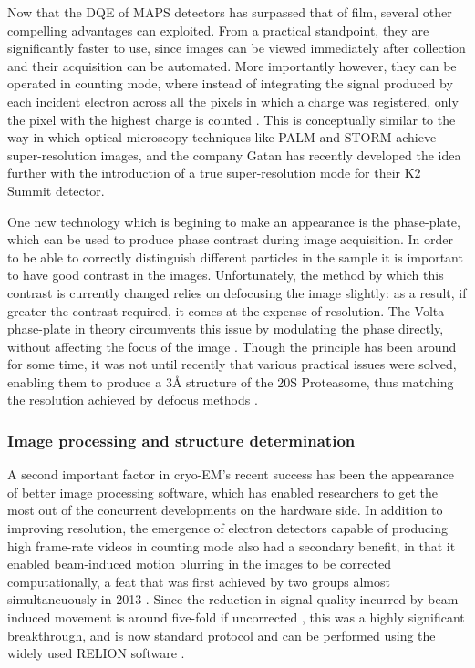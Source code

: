 \documentclass[a4paper,11pt,twoside,openright]{scrbook}
\begin{document}
Now that the DQE of MAPS detectors has surpassed that of film, several other compelling advantages can exploited. From a practical standpoint, they are significantly faster to use, since images can be viewed immediately after collection and their acquisition can be automated. More importantly however, they can be operated in counting mode, where instead of integrating the signal produced by each incident electron across all the pixels in which a charge was registered, only the pixel with the highest charge is counted \cite{McMullan2009a}. This is conceptually similar to the way in which optical microscopy techniques like PALM \cite{Betzig2006} and STORM \cite{Rust2006} achieve super-resolution images, and the company Gatan has recently developed the idea further with the introduction of a true super-resolution mode for their K2 Summit detector.

One new technology which is begining to make an appearance is the phase-plate, which can be used to produce phase contrast during image acquisition. In order to be able to correctly distinguish different particles in the sample it is important to have good contrast in the images. Unfortunately, the method by which this contrast is currently changed relies on defocusing the image slightly: as a result, if greater the contrast required, it comes at the expense of resolution. The Volta phase-plate in theory circumvents this issue by modulating the phase directly, without affecting the focus of the image \cite{Danev2014}. Though the principle has been around for some time, it was not until recently that various practical issues were solved, enabling them to produce a 3Å structure of the 20S Proteasome, thus matching the resolution achieved by defocus methods \cite{Danev2016}.

\subsubsection{Image processing and structure determination}
A second important factor in cryo-EM's recent success has been the appearance of better image processing software, which has enabled researchers to get the most out of the concurrent developments on the hardware side. In addition to improving resolution, the emergence of electron detectors capable of producing high frame-rate videos in counting mode also had a secondary benefit, in that it enabled beam-induced motion blurring in the images to be corrected computationally, a feat that was first achieved by two groups almost simultaneuously in 2013 \cite{Bai2013, Li2013}. Since the reduction in signal quality incurred by beam-induced movement is around five-fold if uncorrected \cite{Henderson1985}, this was a highly significant breakthrough, and is now standard protocol and can be performed using the widely used RELION software \cite{Scheres2012,Scheres2014}.
\end{document}
